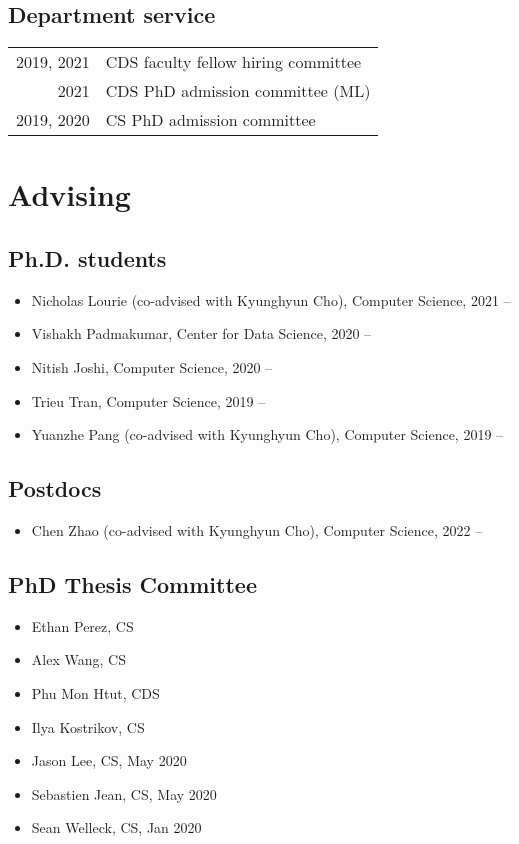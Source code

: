 \documentclass[a4paper,11pt]{article}
\begin{document}
\subsection{Department service}
\begin{tabular}{rl}
    2019, 2021 & CDS faculty fellow hiring committee \\
    2021 & CDS PhD admission committee (ML) \\
    2019, 2020 & CS PhD admission committee
\end{tabular}

\section{Advising}
\subsection{Ph.D. students}
\begin{itemize}[itemsep=-5pt]
    \item Nicholas Lourie (co-advised with Kyunghyun Cho), Computer Science, 2021 --
    \item Vishakh Padmakumar, Center for Data Science, 2020 --
    \item Nitish Joshi, Computer Science, 2020 --
    \item Trieu Tran, Computer Science, 2019 --
    \item Yuanzhe Pang (co-advised with Kyunghyun Cho), Computer Science, 2019 --
\end{itemize}

\subsection{Postdocs}
\begin{itemize}[itemsep=-5pt]
    \item Chen Zhao (co-advised with Kyunghyun Cho), Computer Science, 2022 --
\end{itemize}

\subsection{PhD Thesis Committee}
\begin{itemize}[itemsep=-5pt]
    \item Ethan Perez, CS
    \item Alex Wang, CS
    \item Phu Mon Htut, CDS 
    \item Ilya Kostrikov, CS
    \item Jason Lee, CS, May 2020 
    \item Sebastien Jean, CS, May 2020
    \item Sean Welleck, CS, Jan 2020
\end{itemize}
\end{document}
